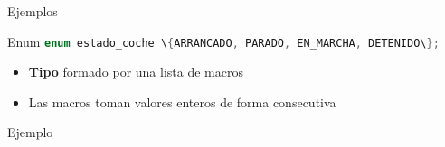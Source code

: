 \documentclass{mybeamer}
\begin{document}
\begin{framesubsubsec}{Ejemplos}
	
\end{framesubsubsec}

\begin{framesubsec}{Enum}
	\lstinline[language=C]|enum estado_coche \{ARRANCADO, PARADO, EN_MARCHA, DETENIDO\};|

	\begin{itemize}
		\item \textbf{Tipo} formado por una lista de macros
		\item Las macros toman valores enteros de forma
			consecutiva
	\end{itemize}
\end{framesubsec}

\begin{framesubsubsec}{Ejemplo}
	\setlength\columnsep{1cm}
	\begin{multicols}{2}
		
	\end{multicols}
\end{framesubsubsec}

\end{document}
